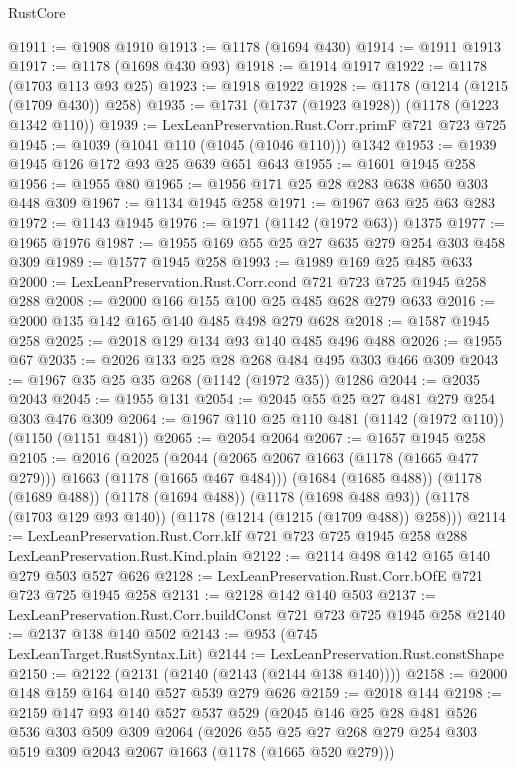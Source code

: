 \begin{lexlean}{RustCore}
\begin{coremodule}
@1911 := @1908 @1910
@1913 := @1178 (@1694 @430)
@1914 := @1911 @1913
@1917 := @1178 (@1698 @430 @93)
@1918 := @1914 @1917
@1922 := @1178 (@1703 @113 @93 @25)
@1923 := @1918 @1922
@1928 := @1178 (@1214 (@1215 (@1709 @430)) @258)
@1935 := @1731 (@1737 (@1923 @1928)) (@1178 (@1223 @1342 @110))
@1939 := LexLeanPreservation.Rust.Corr.primF @721 @723 @725
@1945 := @1039 (@1041 @110 (@1045 (@1046 @110))) @1342
@1953 := @1939 @1945 @126 @172 @93 @25 @639 @651 @643
@1955 := @1601 @1945 @258
@1956 := @1955 @80
@1965 := @1956 @171 @25 @28 @283 @638 @650 @303 @448 @309
@1967 := @1134 @1945 @258
@1971 := @1967 @63 @25 @63 @283
@1972 := @1143 @1945
@1976 := @1971 (@1142 (@1972 @63)) @1375
@1977 := @1965 @1976
@1987 := @1955 @169 @55 @25 @27 @635 @279 @254 @303 @458 @309
@1989 := @1577 @1945 @258
@1993 := @1989 @169 @25 @485 @633
@2000 := LexLeanPreservation.Rust.Corr.cond @721 @723 @725 @1945 @258 @288
@2008 := @2000 @166 @155 @100 @25 @485 @628 @279 @633
@2016 := @2000 @135 @142 @165 @140 @485 @498 @279 @628
@2018 := @1587 @1945 @258
@2025 := @2018 @129 @134 @93 @140 @485 @496 @488
@2026 := @1955 @67
@2035 := @2026 @133 @25 @28 @268 @484 @495 @303 @466 @309
@2043 := @1967 @35 @25 @35 @268 (@1142 (@1972 @35)) @1286
@2044 := @2035 @2043
@2045 := @1955 @131
@2054 := @2045 @55 @25 @27 @481 @279 @254 @303 @476 @309
@2064 := @1967 @110 @25 @110 @481 (@1142 (@1972 @110)) (@1150 (@1151 @481))
@2065 := @2054 @2064
@2067 := @1657 @1945 @258
@2105 := @2016
    (@2025
      (@2044 (@2065 @2067 @1663 (@1178 (@1665 @477 @279))) @1663 (@1178 (@1665 @467 @484)))
      (@1684 (@1685 @488))
      (@1178 (@1689 @488))
      (@1178 (@1694 @488))
      (@1178 (@1698 @488 @93))
      (@1178 (@1703 @129 @93 @140))
      (@1178 (@1214 (@1215 (@1709 @488)) @258)))
@2114 := LexLeanPreservation.Rust.Corr.kIf
    @721
    @723
    @725
    @1945
    @258
    @288
    LexLeanPreservation.Rust.Kind.plain
@2122 := @2114 @498 @142 @165 @140 @279 @503 @527 @626
@2128 := LexLeanPreservation.Rust.Corr.bOfE @721 @723 @725 @1945 @258
@2131 := @2128 @142 @140 @503
@2137 := LexLeanPreservation.Rust.Corr.buildConst @721 @723 @725 @1945 @258
@2140 := @2137 @138 @140 @502
@2143 := @953 (@745 LexLeanTarget.RustSyntax.Lit)
@2144 := LexLeanPreservation.Rust.constShape
@2150 := @2122 (@2131 (@2140 (@2143 (@2144 @138 @140))))
@2158 := @2000 @148 @159 @164 @140 @527 @539 @279 @626
@2159 := @2018 @144
@2198 := @2159
    @147
    @93
    @140
    @527
    @537
    @529
    (@2045
      @146
      @25
      @28
      @481
      @526
      @536
      @303
      @509
      @309
      @2064
      (@2026 @55 @25 @27 @268 @279 @254 @303 @519 @309 @2043 @2067 @1663 (@1178 (@1665 @520 @279)))

\end{coremodule}
\end{lexlean}
